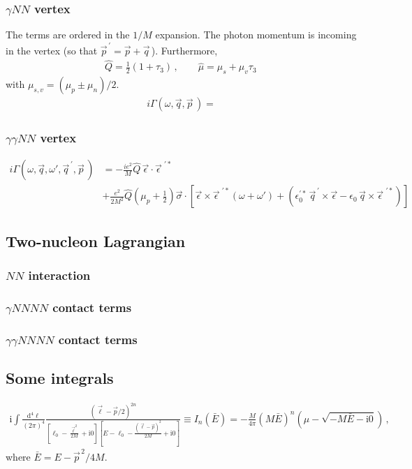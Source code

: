 \documentclass[prl,
twocolumn,
showpacs,preprintnumbers,amsmath,amssymb,
superscriptaddress,
a4paper,nofootinbib,longbibliography]{revtex4-2}
\def\nn{\nonumber}
\newcommand{\ez}{\epsilon_0}
\newcommand{\ezp}{\epsilon_0^{\prime*}}
\def\ve{\vec\epsilon}
\def\vep{\vec\epsilon^{\,\,\prime*}}
\begin{document}
\subsubsection{$\gamma NN$ vertex}
The terms are ordered in the $1/M$ expansion. The photon momentum is incoming in the vertex
(so that $\vec p^{\,\prime} = \vec p + \vec q\,$). Furthermore,
\begin{align}
    \hat{Q} = \frac{1}{2}(1+\tau_3)\,,\qquad \hat{\mu} = \mu_s +\mu_v\tau_3\,
\end{align}
with $\mu_{s,v}=(\mu_p\pm\mu_n)/2$.
\begin{align}
i\Gamma(\omega, \vec q,\vec p\,) = 
\end{align}

\subsubsection{$\gamma\gamma NN$ vertex}
\begin{align}
    i\Gamma(\omega, \vec q,\omega',\vec q^{\,\prime},\vec p\,)&= -\frac{ie^2}{M}\hat{Q}\, \ve\cdot\vep \nn\\
    & +\frac{e^2}{2M^2}\hat{Q}\left(\mu_p+\frac{1}{2}\right)\vec\sigma\cdot\left[\ve\times\vep(\omega+\omega')+(\ezp\, \vec q^{\,\prime} \times\ve -\ez \, \vec q\times\vep)\right]
\end{align}
\subsection{Two-nucleon Lagrangian}
\subsubsection{$NN$ interaction}
\subsubsection{$\gamma NNNN$ contact terms}
\subsubsection{$\gamma \gamma NNNN$ contact terms}

\subsection{Some integrals}
\begin{align}
  \mathrm{i}\int\frac{\mathrm{d}^4 \ell }{(2\pi)^4}\frac{(\vec \ell-\vec p/2)^{2n}}{\left[\ell_0-\frac{\vec\ell^2}{2M}+\mathrm{i}0\right]\left[E-\ell_0-\frac{(\vec\ell-\vec p)^2}{2M}+\mathrm{i}0\right]}\equiv I_n(\bar{E})= -\frac{M}{4\pi}\left(M \bar{E}\right)^n\left(\mu -\sqrt{-M\bar{E}-\mathrm{i}0}\right)\,,
\end{align}
where $\bar{E}=E-\vec p^{\,2}/4M$.


\end{document}
